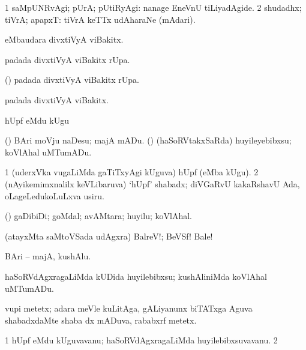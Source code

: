 {{{{{{\bentry
{}
  \gl{\kirxvi}\bmng
\bnum
\num{1} saMpUNRvAgi; pUrA; pUtiRyAgi:  nanage EneVnU tiLiyadAgide. 
\num{2} shudadhx; tiVrA; apapxT:  tiVrA keTTx udAharaNe (mAdari). 
\enum
\emng
\eentry

\bentry
{}
  \gl{\sanA}\bmng
{} eMbaudara divxtiVyA viBakitx. 
\emng
\eentry

\bentry
{}
  \gl{\sanA}\bmng
{} padada divxtiVyA viBakitx rUpa. 
\emng
\eentry

\bentry
{}
  \gl{\sanA}\bmng
(\pArxparx)  padada divxtiVyA viBakitx rUpa. 
\emng
\eentry

\bentry
{}
  \gl{\sanA}\bmng
{} padada divxtiVyA viBakitx. 
\emng
\eentry

\bentry
{} 
\gl{\akirx}
\expl{}
\bmng
hUpf eMdu kUgu 
\emng

\noindent
  \gl{\pagu} \bmng
  (\AmA) 
\banum
{} BAri moVju naDesu; majA mADu. 
 (\ame) (haSoRVtakxSaRda) huyileyebibxsu; koVlAhal uMTumADu. 
\eanum
\emng
\eentry

\bentry
{} 
\gl{\nA}
\bmng
\bnum
\num{1} (uderxVka \mo vugaLiMda gaTiTxyAgi kUguva) hUpf (eMba kUgu). 
\num{2} (nAyikemimxnalilx keVLibaruva) `hUpf' shabadx; diVGaRvU kakaRshavU Ada, oLageLedukoLuLxva usiru. 
\enum
\emng
\eentry

\bentry
{}
  \gl{\nA}\bmng
(\ame) gaDibiDi; goMdal; avAMtara; huyilu; koVlAhal. 
\emng
\eentry

\bentry
{}
  \gl{\BAavayx}\bmng
(atayxMta saMtoVSada udAgxra) BalreV!; BeVSf! Bale! 
\emng
\eentry

\bentry
{}
\gl{\nA}
\bmng
BAri -- majA, kushAlu. 
\emng

\noindent
\gl{\pagu}
\bmng
{} haSoRVdAgxragaLiMda kUDida huyilebibxsu; kushAliniMda koVlAhal uMTumADu. 
\emng
\eentry

\bentry
{}
 \gl{\nA}\bmng
vupi metetx; adara meVle kuLitAga, gALiyanunx biTATxga Aguva shabadxdaMte shaba dx mADuva, rababxrf metetx. 
\emng
\eentry

\bentry
{}
  \gl{\nA}\bmng
\bnum
\num{1} hUpf eMdu kUguvavanu; haSoRVdAgxragaLiMda huyilebibxsuvavanu. 
\num{2}  
\enum
\emng
\eentry

}}}}}}

